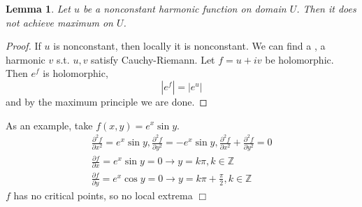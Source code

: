 \documentclass{article}
\newtheorem{lemma}[theorem]{Lemma}
\begin{document}
\begin{lemma}
Let $u$ be a nonconstant harmonic function on domain $U$. Then it does not achieve maximum on $U$.
\end{lemma}
\begin{proof}
If $u$ is nonconstant, then locally it is nonconstant. We can find a , a harmonic $v$ s.t. $u,v$ satisfy Cauchy-Riemann. Let $f = u + iv$ be holomorphic. Then $e^f$ is holomorphic,
$$|e^f| = |e^u|$$
and by the maximum principle we are done.
\end{proof}

As an example, take $f(x,y) = e^x \sin y$.
\begin{gather*}
\frac{\partial^2 f}{\partial x^2} = e^x \sin y, \frac{\partial^2 f}{\partial y^2} = - e^x \sin y, \frac{\partial^2 f}{\partial x^2} + \frac{\partial^2 f}{\partial y^2} = 0\\
\frac{\partial f}{\partial x} = e^x \sin y = 0 \to y = k\pi, k \in \mathbb{Z}\\
\frac{\partial f}{\partial y} = e^x \cos y = 0 \to y = k\pi + \frac{\pi}{2}, k \in \mathbb{Z}
\end{gather*}
$f$ has no critical points, so no local extrema $\Box$
\end{document}
